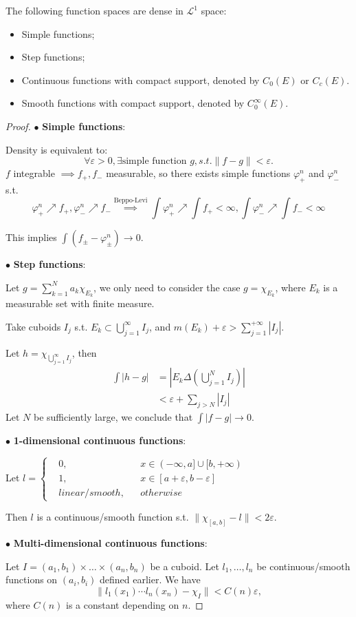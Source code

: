 \begin{theorem}
    The following function spaces are dense in $ \mathcal{L}^1$ space:
	\begin{itemize}
		\item Simple functions;
		\item Step functions;
		\item Continuous functions with compact support,
			denoted by $C_0(E)$ or $C_c(E)$.
		\item Smooth functions with compact support,
			denoted by  $C_0^\infty(E)$.
	\end{itemize}
\end{theorem}
\begin{proof}[Proof]
	$\bullet$ \textbf {Simple functions}:

    Density is equivalent to:
	\[
	\forall \varepsilon>0, \exists \text{simple function } g, s.t.
	\lVert f-g \rVert <\varepsilon.
	\]
	$f$ integrable  $ \implies f_+, f_-$ measurable,
	so there exists simple functions $\varphi_+^n$ and $\varphi_-^n$ s.t.
	\[
	\varphi_+^n\nearrow f_+,\varphi_-^n\nearrow f_-
	\overset{\text{Beppo-Levi}}{\implies} \int \varphi_+^n\nearrow \int f_+<\infty,
	\int \varphi_-^n\nearrow \int f_-<\infty
	\]

	This implies $\int (f_\pm - \varphi_\pm^n) \to 0$.

	$\bullet$ \textbf{Step functions}:

	Let $g = \sum_{k=1}^{N} a_k \chi_{E_k}$, we only need to consider the case
	$g = \chi_{E_k}$, where $E_k$ is a measurable set with finite measure.

	Take cuboids $I_j$ s.t.  $E_k \subset \bigcup_{j=1}^\infty I_j$,
	and $m(E_k) + \varepsilon > \sum_{j=1}^{+\infty} |I_j|$.

	Let $h = \chi_{\bigcup_{j=1}^\infty I_j}$, then
	\begin{align*}
		\int |h-g| &= \left|E_k \Delta \left(\bigcup_{j=1}^N I_j\right)\right|\\
	&< \varepsilon + \sum_{j>N} |I_j|
	\end{align*}
	Let $N$ be sufficiently large, we conclude that $\int|f-g|\to 0$.

	$\bullet$ \textbf {1-dimensional continuous functions}:

	Let $l = \left\{\begin{aligned}
		&0, &&x\in (-\infty, a]\cup [b, +\infty)\\
		&1, &&x\in [a+ \varepsilon, b - \varepsilon]\\
		&linear / smooth, && otherwise
	\end{aligned}\right.$

	Then $l$ is a continuous/smooth function s.t.
	$ \lVert \chi_{[a,b]} - l \rVert < 2\varepsilon$.

	$\bullet$ \textbf {Multi-dimensional continuous functions}:

	Let $I = (a_1,b_1)\times \dots \times (a_n,b_n)$ be a cuboid.
	Let $l_1,\dots, l_n$ be continuous/smooth functions on $(a_i, b_i)$
	defined earlier. We have
	\[
	\lVert l_1(x_1)\cdots l_n(x_n) - \chi_I \rVert < C(n)\varepsilon,
	\]
	where $C(n)$ is a constant depending on  $n$.
\end{proof}

